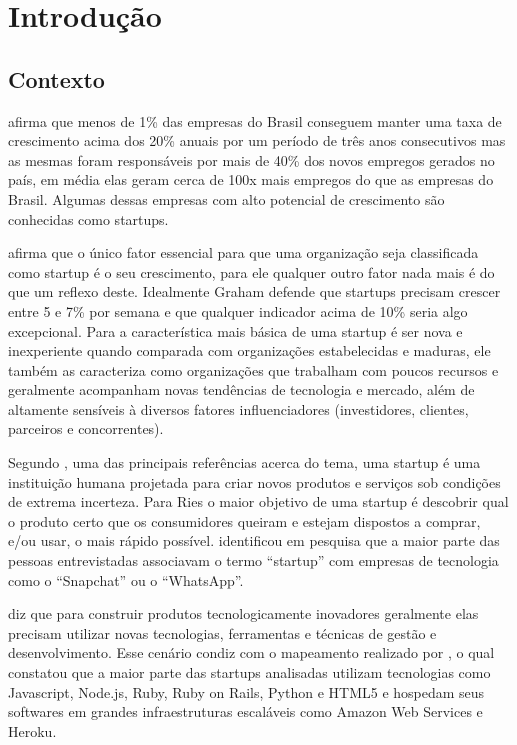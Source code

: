 \chapter{Introdução}
\label{cap-introducao}

\section{Contexto}
\label{section:contexto}

 afirma que menos de 1\% das empresas do Brasil conseguem manter uma taxa de crescimento acima dos 20\% anuais por um período de três anos consecutivos mas as mesmas foram responsáveis por mais de 40\% dos novos empregos gerados no país, em média elas geram cerca de 100x mais empregos do que as empresas do Brasil. Algumas dessas empresas com alto potencial de crescimento são conhecidas como startups.

 afirma que o único fator essencial para que uma organização seja classificada como startup é o seu crescimento, para ele qualquer outro fator nada mais é do que um reflexo deste. Idealmente Graham defende que startups precisam crescer entre 5 e 7\% por semana e que qualquer indicador acima de 10\% seria algo excepcional. Para  a característica mais básica de uma startup é ser nova e inexperiente quando comparada com organizações estabelecidas e maduras, ele também as caracteriza como organizações que trabalham com poucos recursos e geralmente acompanham novas tendências de tecnologia e mercado, além de altamente sensíveis à diversos fatores influenciadores (investidores, clientes, parceiros e concorrentes).

Segundo , uma das principais referências acerca do tema, uma startup é uma instituição humana projetada para criar novos produtos e serviços sob condições de extrema incerteza. Para Ries o maior objetivo de uma startup é descobrir qual o produto certo que os consumidores queiram e estejam dispostos a comprar, e/ou usar, o mais rápido possível.  identificou em pesquisa que a maior parte das pessoas entrevistadas associavam o termo ``startup'' com empresas de tecnologia como o ``Snapchat'' ou o ``WhatsApp''.

 diz que para construir produtos tecnologicamente inovadores geralmente elas precisam utilizar novas tecnologias, ferramentas e técnicas de gestão e desenvolvimento. Esse cenário condiz com o mapeamento realizado por , o qual constatou que a maior parte das startups analisadas utilizam tecnologias como Javascript, Node.js, Ruby, Ruby on Rails, Python e HTML5 e hospedam seus softwares em grandes infraestruturas escaláveis como Amazon Web Services e Heroku. 

